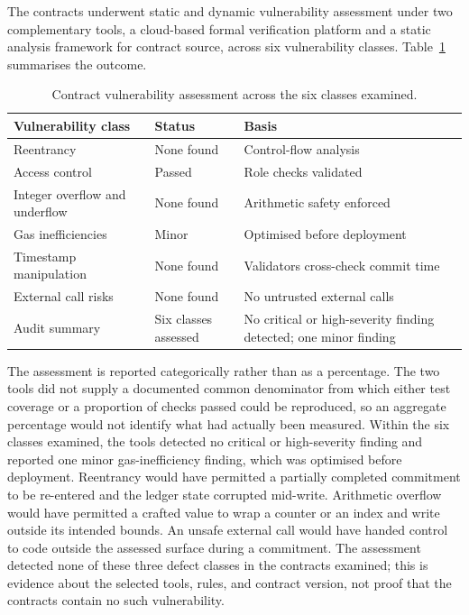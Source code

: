 The contracts underwent static and dynamic vulnerability assessment under two complementary tools, a cloud-based formal verification platform and a static analysis framework for contract source, across six vulnerability classes. Table~\ref{tab:sec-audit} summarises the outcome.

\begin{table}[!htbp]
  \centering
  \footnotesize
  \setlength{\tabcolsep}{5pt}
  \renewcommand{\arraystretch}{1.3}
  \caption{Contract vulnerability assessment across the six classes examined.}
  \label{tab:sec-audit}
  \begin{tabularx}{\textwidth}{@{}
      >{\raggedright\arraybackslash}p{4.4cm}
      >{\raggedright\arraybackslash}p{2.4cm}
      >{\raggedright\arraybackslash}X@{}}
    \toprule
    \textbf{Vulnerability class} & \textbf{Status} & \textbf{Basis} \\
    \midrule
    Reentrancy & None found & Control-flow analysis \\
    Access control & Passed & Role checks validated \\
    Integer overflow and underflow & None found & Arithmetic safety enforced \\
    Gas inefficiencies & Minor & Optimised before deployment \\
    Timestamp manipulation & None found & Validators cross-check commit time \\
    External call risks & None found & No untrusted external calls \\
    \midrule
    Audit summary & Six classes assessed & No critical or high-severity finding
    detected; one minor finding \\
    \bottomrule
  \end{tabularx}
\end{table}

The assessment is reported categorically rather than as a percentage. The two
tools did not supply a documented common denominator from which either test
coverage or a proportion of checks passed could be reproduced, so an aggregate
percentage would not identify what had actually been measured. Within the six
classes examined, the tools detected no critical or high-severity finding and
reported one minor gas-inefficiency finding, which was optimised before
deployment. Reentrancy would have permitted a partially completed commitment to
be re-entered and the ledger state corrupted mid-write. Arithmetic overflow
would have permitted a crafted value to wrap a counter or an index and write
outside its intended bounds. An unsafe external call would have handed control
to code outside the assessed surface during a commitment. The assessment
detected none of these three defect classes in the contracts examined; this is
evidence about the selected tools, rules, and contract version, not proof that
the contracts contain no such vulnerability.

